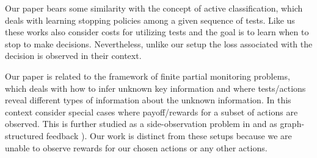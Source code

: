 \documentclass[11pt]{article} %
\newcommand{\todoc}[2][]{\todo[color=Apricot!20,size=\tiny,#1]{Cs: #2}}
\newcommand{\todom}[2][]{\todo[color=Cerulean!20,size=\tiny,#1]{M: #2}}
\begin{document}
Our paper bears some similarity with the concept of active classification, which deals with learning stopping policies\cite{poczos2009,ActiveClass-AIJ-s} among a given sequence of tests. Like us these works also consider costs for utilizing tests and the goal is to learn when to stop to make decisions. Nevertheless, unlike our setup the loss associated with the decision is observed in their context. %
%
%
%
%

Our paper is related to the framework of finite partial monitoring problems\cite{BaFoPaRaSze14}, which deals with how to infer unknown key information and where tests/actions reveal different types of information about the unknown information. In this context 
\cite{AgTeAn89:pmon} consider special cases where payoff/rewards for a subset of actions are observed. This is further studied as a side-observation problem in \cite{MaSh11} and as graph-structured feedback \cite{COLT15_OnlineLearningWithFeedback_AlonBianchiDekel, NIPS13_FromBanditsToExperts_AlonBianchiGentile,WGySz:NIPS15}). Our work is distinct from these setups because we are unable to observe rewards for our chosen actions or any other actions.
\vspace{-10pt}
\end{document}

